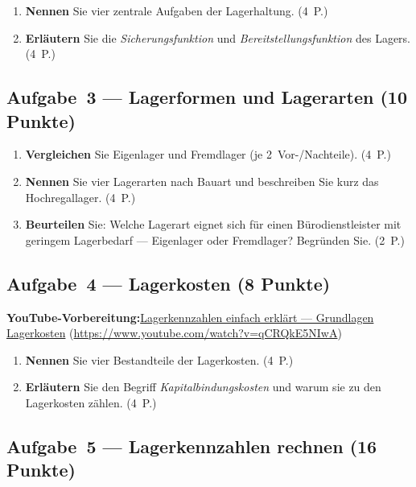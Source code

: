 \documentclass[11pt, a4paper]{article}
\begin{document}
\begin{enumerate}[label=(\alph*)]
  \item \textbf{Nennen} Sie vier zentrale Aufgaben der Lagerhaltung. \hfill (4~P.)
  \item \textbf{Erläutern} Sie die \emph{Sicherungsfunktion} und \emph{Bereitstellungsfunktion} des Lagers. \hfill (4~P.)
\end{enumerate}

\subsection*{Aufgabe~3 --- Lagerformen und Lagerarten (10 Punkte)}

\begin{enumerate}[label=(\alph*)]
  \item \textbf{Vergleichen} Sie Eigenlager und Fremdlager (je 2~Vor-/Nachteile). \hfill (4~P.)
  \item \textbf{Nennen} Sie vier Lagerarten nach Bauart und beschreiben Sie kurz das Hochregallager. \hfill (4~P.)
  \item \textbf{Beurteilen} Sie: Welche Lagerart eignet sich für einen Bürodienstleister mit geringem Lagerbedarf --- Eigenlager oder Fremdlager? Begründen Sie. \hfill (2~P.)
\end{enumerate}

\subsection*{Aufgabe~4 --- Lagerkosten (8 Punkte)}

\noindent\textbf{\color{bfwAccent}YouTube-Vorbereitung:}\enspace \href{https://www.youtube.com/watch?v=qCRQkE5NIwA}{Lagerkennzahlen einfach erklärt --- Grundlagen Lagerkosten} (\url{https://www.youtube.com/watch?v=qCRQkE5NIwA})

\medskip
\begin{enumerate}[label=(\alph*)]
  \item \textbf{Nennen} Sie vier Bestandteile der Lagerkosten. \hfill (4~P.)
  \item \textbf{Erläutern} Sie den Begriff \emph{Kapitalbindungskosten} und warum sie zu den Lagerkosten zählen. \hfill (4~P.)
\end{enumerate}

\subsection*{Aufgabe~5 --- Lagerkennzahlen rechnen (16 Punkte)}
\end{document}
